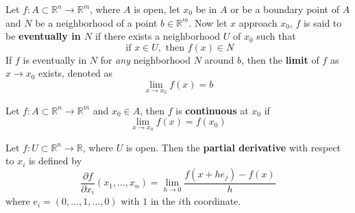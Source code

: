 \documentclass[openany]{book}
\newcommand{\R}{\mathbb{R}}
\begin{document}
\begin{defn}[limit]
    Let $f: A\subset\R^n\to\R^m$, where $A$ is open, let $x_0$ be in $A$ or be a boundary point of $A$ and $N$ be a neighborhood of a point $b\in\R^m$. Now let $x$ approach $x_0$, $f$ is said to be \textbf{eventually in $N$} if there exists a neighborhood $U$ of $x_0$ such that 
    \begin{equation*}
        \text{ if } x\in U, \text{ then } f(x)\in N
    \end{equation*}
    If $f$ is eventually in $N$ for \textit{any} neighborhood $N$ around $b$, then the \textbf{limit} of $f$ as $x\to x_0$ exists, denoted as 
    \begin{equation*}
        \lim_{x\to x_0}f(x)=b
    \end{equation*}
\end{defn}

\begin{defn}[continuous]
    Let $f:A\subset\R^n\to\R^m$ and $x_0\in A$, then $f$ is \textbf{continuous} at $x_0$ if 
    \begin{equation*}
        \lim_{x\to x_0}f(x)=f(x_0)
    \end{equation*}
\end{defn}


\begin{defn}
    Let $f:U\subset\R^n\to\R$, where $U$ is open. Then the \textbf{partial derivative} with respect to $x_i$ is defined by 
    \begin{equation*}
        \frac{\partial f}{\partial x_i}(x_1, \dots, x_n)=\lim_{h\to 0}\frac{f(x+he_j)-f(x)}{h}
    \end{equation*}
    where $e_i=(0,\dots, 1,\dots, 0)$ with $1$ in the $i$th coordinate. 
\end{defn}
\end{document}
